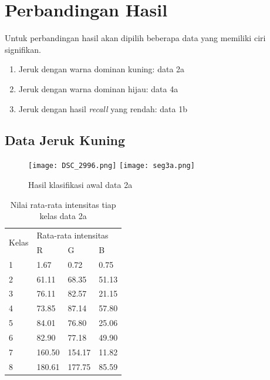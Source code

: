 \documentclass[laporan.tex]{subfiles}
\begin{document}
\FloatBarrier
\section{Perbandingan Hasil}

Untuk perbandingan hasil akan dipilih beberapa data yang memiliki ciri signifikan.

\begin{enumerate}
\item Jeruk dengan warna dominan kuning: data 2a
\item Jeruk dengan warna dominan hijau: data 4a
\item Jeruk dengan hasil \emph{recall} yang rendah: data 1b
\end{enumerate}

\subsection{Data Jeruk Kuning}

\begin{figure}[h!]
\centering
\texttt{[image: DSC\_2996.png]}
\texttt{[image: seg3a.png]}
\caption[]{Hasil klasifikasi awal data 2a}
\end{figure}

\begin{table}[h!]
\centering
\begin{tabular}{|l|l|l|l|}
\cline{1-4}
\multirow{2}{*}{Kelas} & \multicolumn{3}{l|}{Rata-rata intensitas} \\
\cline{2-4}
 & R & G & B \\
\cline{1-4}
1 & 1.67 & 0.72 & 0.75 \\
2 & 61.11 & 68.35 & 51.13 \\
3 & 76.11 & 82.57 & 21.15 \\
4 & 73.85 & 87.14 & 57.80 \\
5 & 84.01 & 76.80 & 25.06 \\
6 & 82.90 & 77.18 & 49.90 \\
7 & 160.50 & 154.17 & 11.82 \\
8 & 180.61 & 177.75 & 85.59 \\
\cline{1-4}
\end{tabular}
\caption[]{Nilai rata-rata intensitas tiap kelas data 2a}
\label{table:avgyellow1}
\end{table}
\end{document}
